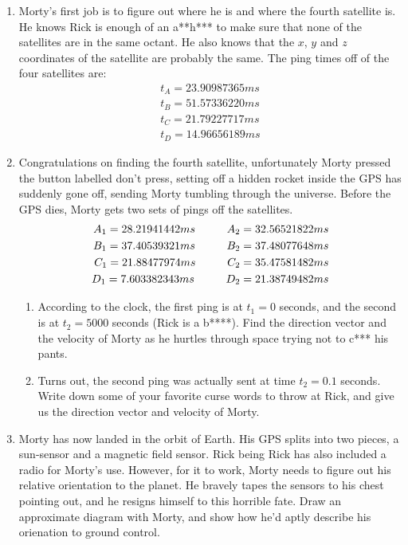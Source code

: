 \documentclass[a4paper, 12pt]{exam}
\newcommand{\cuspac}{\hspace*{1cm}}
\begin{document}
	\begin{enumerate}[label = (\alph*)]
		\item Morty's first job is to figure out where he is and where the fourth satellite is. He knows Rick is enough of an a**h*** to make sure that none of the satellites are in the same octant. He also knows that the $x$, $y$ and $z$ coordinates of the satellite are probably the same. The ping times off of the four satellites are:
		\begin{align*}
			t_A = 23.90987365 ms \\
			t_B = 51.57336220 ms \\
			t_C = 21.79227717 ms \\
			t_D = 14.96656189 ms
		\end{align*}
		\item Congratulations on finding the fourth satellite, unfortunately Morty pressed the button labelled don't press, setting off a hidden rocket inside the GPS has suddenly gone off, sending Morty tumbling through the universe. Before the GPS dies, Morty gets two sets of pings off the satellites.
		\begin{align*}
			A_1 = 28.21941442 ms \cuspac A_2 = 32.56521822 ms\\
			B_1 = 37.40539321 ms \cuspac B_2 = 37.48077648 ms\\
			C_1 = 21.88477974 ms \cuspac C_2 = 35.47581482 ms\\
			D_1 = 7.603382343 ms \cuspac D_2 = 21.38749482 ms
		\end{align*}
		\vspace{5mm}
		\begin{enumerate}[label = (\roman*)]
			\item According to the clock, the first ping is at $t_1 = 0$ seconds, and the second is at $t_2 = 5000$ seconds (Rick is a b****). Find the direction vector and the velocity of Morty as he hurtles through space trying not to c*** his pants.
			\item Turns out, the second ping was actually sent at time $t_2 = 0.1$ seconds. Write down some of your favorite curse words to throw at Rick, and give us the direction vector and velocity of Morty.
		\end{enumerate}
		\item Morty has now landed in the orbit of Earth. His GPS splits into two pieces, a sun-sensor and a magnetic field sensor. Rick being Rick has also included a radio for Morty's use. However, for it to work, Morty needs to figure out his relative orientation to the planet. He bravely tapes the sensors to his chest pointing out, and he resigns himself to this horrible fate. Draw an approximate diagram with Morty, and show how he'd aptly describe his orienation to ground control.
	\end{enumerate}
\end{document}
